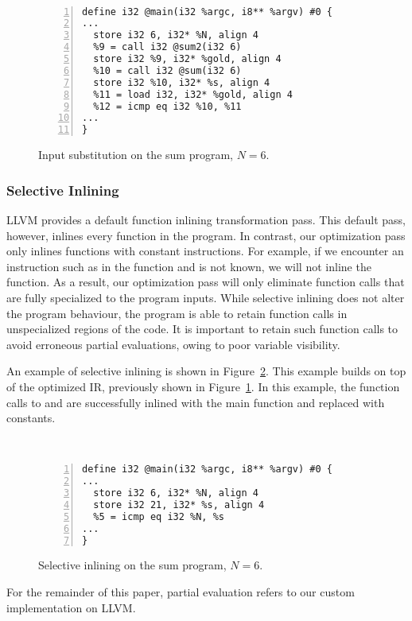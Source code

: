 \begin{figure}[htbp]\
\begin{Verbatim}[frame=single,fontsize={\scriptsize},numbers=left,numbersep=5pt,xleftmargin=10pt]
define i32 @main(i32 %argc, i8** %argv) #0 {
...
  store i32 6, i32* %N, align 4
  %9 = call i32 @sum2(i32 6)
  store i32 %9, i32* %gold, align 4
  %10 = call i32 @sum(i32 6)
  store i32 %10, i32* %s, align 4
  %11 = load i32, i32* %gold, align 4
  %12 = icmp eq i32 %10, %11
...
}
\end{Verbatim}
\caption{Input substitution on the sum program, $N=6$.}
\label{fig:input_sub_ir}
\end{figure}

\bigbreak

\subsubsection{Selective Inlining}

LLVM provides a default function inlining transformation pass.
This default pass, however, inlines every function in the program.
In contrast, our optimization pass only inlines functions with constant instructions.
For example, if we encounter an instruction such as \inlinecode{\%x = add i32 1, \%y} in the function and  is not known, we will not inline the function.
As a result, our optimization pass will only eliminate function calls that are fully specialized to the program inputs.
While selective inlining does not alter the program behaviour, the program is able to retain function calls in unspecialized regions of the code.
It is important to retain such function calls to avoid erroneous partial evaluations, owing to poor variable visibility.

An example of selective inlining is shown in Figure~\ref{fig:inlining_ir}.
This example builds on top of the optimized IR, previously shown in Figure~\ref{fig:input_sub_ir}.
In this example, the function calls to \inlinecode{sum2()} and \inlinecode{sum()} are successfully inlined with the main function and replaced with constants.

\begin{figure}[htbp]\
\begin{Verbatim}[frame=single,fontsize={\scriptsize},numbers=left,numbersep=5pt,xleftmargin=10pt]
define i32 @main(i32 %argc, i8** %argv) #0 {
...
  store i32 6, i32* %N, align 4
  store i32 21, i32* %s, align 4
  %5 = icmp eq i32 %N, %s
...
}
\end{Verbatim}
\caption{Selective inlining on the sum program, $N=6$.}
\label{fig:inlining_ir}
\end{figure}

For the remainder of this paper, partial evaluation refers to our custom implementation on LLVM. 
